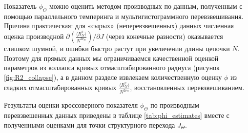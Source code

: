     Показатель $\phi_\Theta $ можно оценить методом производных по данным, полученным с помощью параллельного темперинга и мультигистограммного перевзвешивания.
 Причина практическая: для «сырых» (неперевзвешенных) данных численная оценка производной
 $\partial (  \frac{\langle R_N^2\rangle}{N^{2\nu_\Theta}}    )   /\partial J$ (через конечные разности) оказывается слишком шумной,
 и ошибки быстро растут при увеличении длины цепочки $N$.
 Поэтому для прямых данных мы ограничиваемся качественной оценкой параметров из  коллапса кривых отмасштабированного радиуса (рисунок  \ref{fig:R2_collapse}), 
 а в данном разделе  извлекаем количественную оценку $\phi$  из гладких отмасштабированных кривых  $\frac{\langle R_N^2\rangle}{N^{2\nu_\Theta}}    $, восстановленных перевзвешиванием.
 
 
 
 Результаты оценки кроссоверного показателя $\phi_\Theta$ по производным перевзвешенных данных
 приведены в таблице \ref{tab:phi_estimates} вместе с полученными оценками для точки структурного перехода $J_\Theta$.
 
 
 
